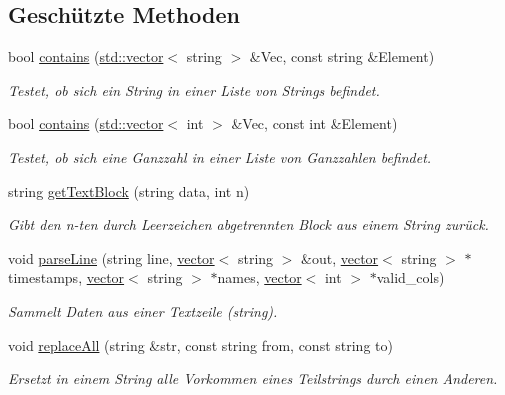 \subsection*{Geschützte Methoden}
\begin{DoxyCompactItemize}
\item 
bool \hyperlink{classCsvToSdConverter_aee01d9654ddf4aac5660b64f39d136de}{contains} (\hyperlink{classstd_1_1vector}{std\-::vector}$<$ string $>$ \&Vec, const string \&Element)
\begin{DoxyCompactList}\small\item\em Testet, ob sich ein String in einer Liste von Strings befindet. \end{DoxyCompactList}\item 
bool \hyperlink{classCsvToSdConverter_a74e089d02b3e184de4784ad35dfb6f96}{contains} (\hyperlink{classstd_1_1vector}{std\-::vector}$<$ int $>$ \&Vec, const int \&Element)
\begin{DoxyCompactList}\small\item\em Testet, ob sich eine Ganzzahl in einer Liste von Ganzzahlen befindet. \end{DoxyCompactList}\item 
string \hyperlink{classCsvToSdConverter_a83da8c064200da09a028d457a53263c5}{get\-Text\-Block} (string data, int n)
\begin{DoxyCompactList}\small\item\em Gibt den n-\/ten durch Leerzeichen abgetrennten Block aus einem String zurück. \end{DoxyCompactList}\item 
void \hyperlink{classCsvToSdConverter_a4be5732a05287e3506925049ee990e1e}{parse\-Line} (string line, \hyperlink{classstd_1_1vector}{vector}$<$ string $>$ \&out, \hyperlink{classstd_1_1vector}{vector}$<$ string $>$ $\ast$timestamps, \hyperlink{classstd_1_1vector}{vector}$<$ string $>$ $\ast$names, \hyperlink{classstd_1_1vector}{vector}$<$ int $>$ $\ast$valid\-\_\-cols)
\begin{DoxyCompactList}\small\item\em Sammelt Daten aus einer Textzeile (string). \end{DoxyCompactList}\item 
void \hyperlink{classCsvToSdConverter_a16d31068591e8c70604267e34c0f0cb2}{replace\-All} (string \&str, const string from, const string to)
\begin{DoxyCompactList}\small\item\em Ersetzt in einem String alle Vorkommen eines Teilstrings durch einen Anderen. \end{DoxyCompactList}\item 

\end{DoxyCompactItemize}
